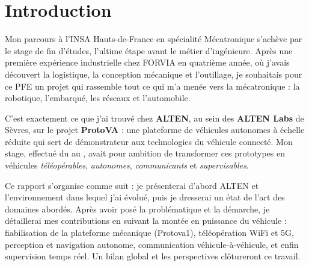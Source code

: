 \chapter*{Introduction}

Mon parcours à l'INSA Hauts-de-France en spécialité Mécatronique s'achève par le
stage de fin d'études, l'ultime étape avant le métier d'ingénieure. Après une
première expérience industrielle chez FORVIA en quatrième année, où j'avais
découvert la logistique, la conception mécanique et l'outillage, je souhaitais
pour ce PFE un projet qui rassemble tout ce qui m'a menée vers la mécatronique :
la robotique, l'embarqué, les réseaux et l'automobile.

C'est exactement ce que j'ai trouvé chez \textbf{ALTEN}, au sein des
\textbf{ALTEN Labs} de Sèvres, sur le projet \textbf{ProtoVA} : une plateforme
de véhicules autonomes à échelle réduite qui sert de démonstrateur aux
technologies du véhicule connecté. Mon stage, effectué du  au
, avait pour ambition de transformer ces prototypes en
véhicules \emph{téléopérables}, \emph{autonomes}, \emph{communicants} et
\emph{supervisables}.

Ce rapport s'organise comme suit : je présenterai d'abord ALTEN et
l'environnement dans lequel j'ai évolué, puis je dresserai un état de l'art des
domaines abordés. Après avoir posé la problématique et la démarche, je
détaillerai mes contributions en suivant la montée en puissance du véhicule :
fiabilisation de la plateforme mécanique (Protova1), téléopération WiFi et 5G,
perception et navigation autonome, communication véhicule-à-véhicule, et enfin
supervision temps réel. Un bilan global et les perspectives clôtureront ce
travail.
